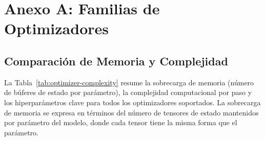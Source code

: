 \section{Anexo A: Familias de Optimizadores}
\label{sec:annex-optimizers}

\subsection{Comparación de Memoria y Complejidad}

La Tabla~\ref{tab:optimizer-complexity} resume la sobrecarga de memoria (número de búferes de estado por parámetro), la complejidad computacional por paso y los hiperparámetros clave para todos los optimizadores soportados. La sobrecarga de memoria se expresa en términos del número de tensores de estado mantenidos por parámetro del modelo, donde cada tensor tiene la misma forma que el parámetro.

